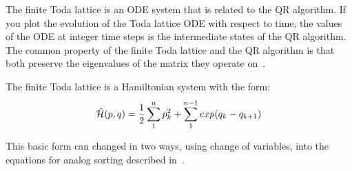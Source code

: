 The finite Toda lattice is an ODE system that is related to the QR algorithm.
If you plot the evolution of the Toda lattice ODE with respect to time, the values of the ODE at integer time steps is the intermediate states of the QR algorithm.
The common property of the finite Toda lattice and the QR algorithm is that both preserve the eigenvalues of the matrix they operate on~\cite{bloch}.

The finite Toda lattice is a Hamiltonian system with the form:
\begin{align}
\hat{\mathcal{H}}(p,q) = \frac{1}{2} \sum^{n}_{1}p_k^2 + \sum^{n-1}_{1}exp(q_k-q_{k+1})
\end{align}

This basic form can changed in two ways, using change of variables, into the equations for analog sorting described in~\cite{brockett}.







